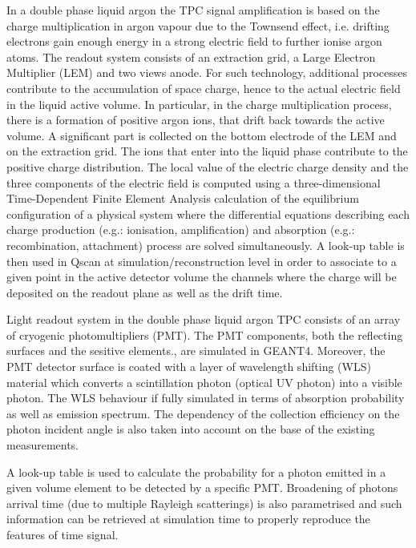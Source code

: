 
In a double phase liquid argon the TPC signal amplification 
is based on the charge multiplication in argon vapour due to the Townsend effect, 
i.e. drifting electrons gain enough energy in a strong electric field to further ionise argon atoms. 
The readout system consists of an extraction grid, a Large Electron Multiplier (LEM) and two views anode.
For such technology, additional processes contribute to the
accumulation of space charge, hence to the actual electric field in the liquid active volume.
In particular, in the charge multiplication process, there is a formation of positive argon ions, 
that drift back towards the active volume. 
A significant part is collected on the bottom electrode of the LEM and on the extraction grid. 
The ions that enter into the liquid phase contribute to the positive charge distribution.
The local value of the electric charge density and the three components of the electric field
is computed using a three-dimensional Time-Dependent Finite Element Analysis calculation of the equilibrium 
configuration of a physical system where the differential equations describing each charge production (e.g.: ionisation, amplification) and
absorption (e.g.: recombination, attachment) process are solved simultaneously. 
A look-up table is then used in Qscan at simulation/reconstruction level in order to associate to a given point in the active
detector volume the channels where the charge will be deposited on the readout plane as well as the drift time.

Light readout system in the double phase liquid argon TPC consists of an array of cryogenic photomultipliers (PMT).
The PMT components, both the reflecting surfaces and the sesitive elements., are simulated in GEANT4.
Moreover, the PMT detector surface is coated with a layer of wavelength shifting (WLS) material which converts a
scintillation photon (optical UV photon) into a visible photon. The WLS behaviour if fully simulated in
terms of absorption probability as well as emission spectrum.
The dependency of the collection efficiency on the photon incident angle is also taken into account on the base
of the existing measurements.  

A look-up table is used to calculate the probability for a photon emitted in a
given volume element to be detected by a specific PMT.
Broadening of photons arrival time (due to multiple Rayleigh scatterings)
is also parametrised and such information can be retrieved at simulation time
to properly reproduce the features of time signal.

